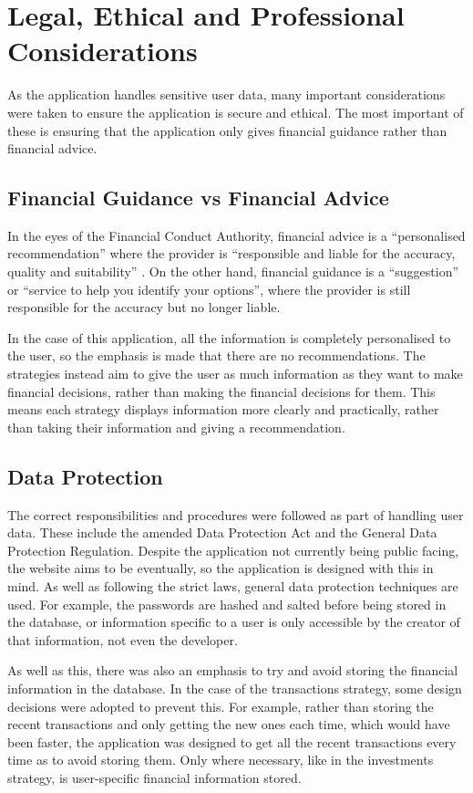 \section{Legal, Ethical and Professional Considerations}
As the application handles sensitive user data, many important considerations were taken to ensure the application is secure and ethical. The most important of these is ensuring that the application only gives financial guidance rather than financial advice.

\subsection{Financial Guidance vs Financial Advice}
In the eyes of the Financial Conduct Authority, financial advice is a ``personalised recommendation'' where the provider is ``responsible and liable for the accuracy, quality and suitability'' \cite{FCA}. On the other hand, financial guidance is a ``suggestion'' or ``service to help you identify your options'', where the provider is still responsible for the accuracy but no longer liable.

In the case of this application, all the information is completely personalised to the user, so the emphasis is made that there are no recommendations. The strategies instead aim to give the user as much information as they want to make financial decisions, rather than making the financial decisions for them. This means each strategy displays information more clearly and practically, rather than taking their information and giving a recommendation.

\subsection{Data Protection}
The correct responsibilities and procedures were followed as part of handling user data. These include the amended Data Protection Act and the General Data Protection Regulation. Despite the application not currently being public facing, the website aims to be eventually, so the application is designed with this in mind. As well as following the strict laws, general data protection techniques are used. For example, the passwords are hashed and salted before being stored in the database, or information specific to a user is only accessible by the creator of that information, not even the developer.

As well as this, there was also an emphasis to try and avoid storing the financial information in the database. In the case of the transactions strategy, some design decisions were adopted to prevent this. For example, rather than storing the recent transactions and only getting the new ones each time, which would have been faster, the application was designed to get all the recent transactions every time as to avoid storing them. Only where necessary, like in the investments strategy, is user-specific financial information stored.